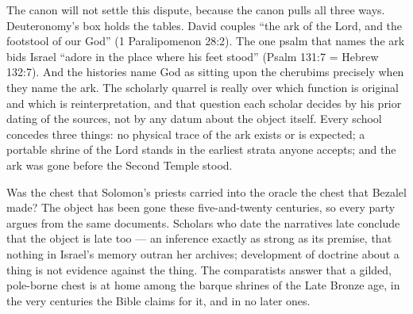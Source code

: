 The canon will not settle this dispute, because the canon pulls all three
ways. Deuteronomy's box holds the tables. David couples ``the ark of the
Lord, and the footstool of our God'' (1 Paralipomenon 28:2). The one psalm
that names the ark bids Israel ``adore in the place where his feet stood''
(Psalm 131:7 = Hebrew 132:7). And the histories name God as sitting upon
the cherubims precisely when they name the ark. The scholarly quarrel is really over which function is original
and which is reinterpretation, and that question each scholar decides by
his prior dating of the sources, not by any datum about the object itself.
Every school concedes three things: no physical trace of the ark exists or
is expected; a portable shrine of the Lord stands in the earliest strata
anyone accepts; and the ark was gone before the Second Temple stood.

Was the chest that Solomon's priests carried into the oracle the chest
that Bezalel made? The object has been gone these five-and-twenty
centuries, so every party argues from the same documents. Scholars who
date the narratives late conclude that the object is late too --- an
inference exactly as strong as its premise, that nothing in Israel's
memory outran her archives; development of doctrine about a thing is not
evidence against the thing. The comparatists answer that a gilded,
pole-borne chest is at home among the barque shrines of the Late Bronze
age, in the very centuries the Bible claims for it, and in no later
ones.

